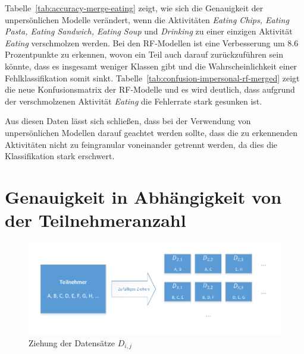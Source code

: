 Tabelle~\ref{tab:accuracy-merge-eating} zeigt, wie sich die Genauigkeit der unpersönlichen Modelle verändert, wenn die Aktivitäten \textit{Eating Chips, Eating Pasta, Eating Sandwich, Eating Soup} und \textit{Drinking} zu einer einzigen Aktivität \textit{Eating} verschmolzen werden. Bei den \ac{RF}-Modellen ist eine Verbesserung um $8.6$ Prozentpunkte zu erkennen, wovon ein Teil auch darauf zurückzuführen sein könnte, dass es insgesamt weniger Klassen gibt und die Wahrscheinlichkeit einer Fehlklassifikation somit sinkt. Tabelle~\ref{tab:confusion-impersonal-rf-merged} zeigt die neue Konfusionsmatrix der \ac{RF}-Modelle und es wird deutlich, dass aufgrund der verschmolzenen Aktivität \textit{Eating} die Fehlerrate stark gesunken ist.

Aus diesen Daten lässt sich schließen, dass bei der Verwendung von unpersönlichen Modellen darauf geachtet werden sollte, dass die zu erkennenden Aktivitäten nicht zu feingranular voneinander getrennt werden, da dies die Klassifikation stark erschwert.

\section{Genauigkeit in Abhängigkeit von der Teilnehmeranzahl}
\label{sec:accuracy-usercount}
\begin{figure}
\centering
\includegraphics[clip, trim=7mm 7mm 7mm 6mm, width=\textwidth]{img/random-set-draw}
\caption{Ziehung der Datensätze $D_{i,j}$}
\label{fig:random-set-draw}
\end{figure}

